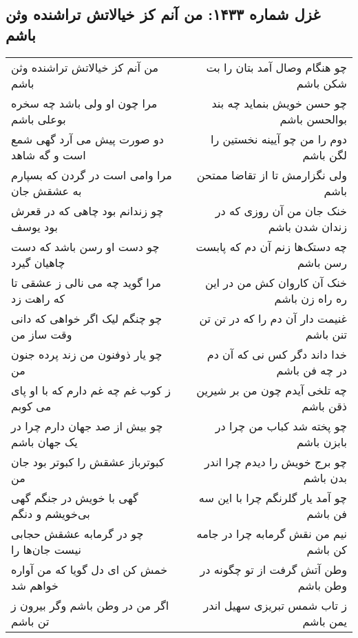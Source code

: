 \begin{center}
\section*{غزل شماره ۱۴۳۳: من آنم کز خیالاتش تراشنده وثن باشم}
\label{sec:1433}
\begin{longtable}{l p{0.5cm} r}
من آنم کز خیالاتش تراشنده وثن باشم
&&
چو هنگام وصال آمد بتان را بت شکن باشم
\\
مرا چون او ولی باشد چه سخره بوعلی باشم
&&
چو حسن خویش بنماید چه بند بوالحسن باشم
\\
دو صورت پیش می آرد گهی شمع است و گه شاهد
&&
دوم را من چو آیینه نخستین را لگن باشم
\\
مرا وامی است در گردن که بسپارم به عشقش جان
&&
ولی نگزارمش تا از تقاضا ممتحن باشم
\\
چو زندانم بود چاهی که در قعرش بود یوسف
&&
خنک جان من آن روزی که در زندان شدن باشم
\\
چو دست او رسن باشد که دست چاهیان گیرد
&&
چه دستک‌ها زنم آن دم که پابست رسن باشم
\\
مرا گوید چه می نالی ز عشقی تا که راهت زد
&&
خنک آن کاروان کش من در این ره راه زن باشم
\\
چو چنگم لیک اگر خواهی که دانی وقت ساز من
&&
غنیمت دار آن دم را که در تن تن تنن باشم
\\
چو یار ذوفنون من زند پرده جنون من
&&
خدا داند دگر کس نی که آن دم در چه فن باشم
\\
ز کوب غم چه غم دارم که با او پای می کوبم
&&
چه تلخی آیدم چون من بر شیرین ذقن باشم
\\
چو بیش از صد جهان دارم چرا در یک جهان باشم
&&
چو پخته شد کباب من چرا در بابزن باشم
\\
کبوترباز عشقش را کبوتر بود جان من
&&
چو برج خویش را دیدم چرا اندر بدن باشم
\\
گهی با خویش در جنگم گهی بی‌خویشم و دنگم
&&
چو آمد یار گلرنگم چرا با این سه فن باشم
\\
چو در گرمابه عشقش حجابی نیست جان‌ها را
&&
نیم من نقش گرمابه چرا در جامه کن باشم
\\
خمش کن ای دل گویا که من آواره خواهم شد
&&
وطن آتش گرفت از تو چگونه در وطن باشم
\\
اگر من در وطن باشم وگر بیرون ز تن باشم
&&
ز تاب شمس تبریزی سهیل اندر یمن باشم
\\
\end{longtable}
\end{center}
